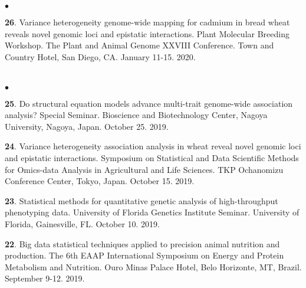 \documentclass[margin,line,10pt]{res}
\newenvironment{list2}{
  \begin{list}{$\bullet$}{%
      \setlength{\itemsep}{0in}
      \setlength{\parsep}{0in} \setlength{\parskip}{0in}
      \setlength{\topsep}{0in} \setlength{\partopsep}{0in} 
      \setlength{\leftmargin}{0.2in}}}{\end{list}}
\begin{document}
\begin{resume}
\begin{list2}
  \vspace{0.5cm}
    
\item [{\bf 26}.] Variance heterogeneity genome-wide mapping for cadmium in bread wheat reveals novel genomic loci and epistatic interactions. Plant Molecular Breeding Workshop. The Plant and Animal Genome XXVIII Conference. Town and Country Hotel, San Diego, CA. January 11-15. 2020.
  
\end{list2}



\section{}
\begin{list2}

\item [{\bf 25}.] Do structural equation models advance multi-trait genome-wide association analysis? Special Seminar. Bioscience and Biotechnology Center, Nagoya University, Nagoya, Japan. October 25. 2019.  
  
  \vspace{0.5cm}
  
   \item [{\bf 24}.] Variance heterogeneity association analysis in wheat reveal novel genomic loci and epistatic interactions. Symposium on Statistical and Data Scientific Methods for Omics-data Analysis in Agricultural and Life Sciences. TKP Ochanomizu Conference Center, Tokyo, Japan. October 15. 2019. 

     \vspace{0.5cm}
    
  \item [{\bf 23}.] Statistical methods for quantitative genetic analysis of high-throughput phenotyping data.  University of Florida Genetics Institute Seminar. University of Florida, Gainesville, FL. October 10. 2019. 

    \vspace{0.5cm}
    
\item [{\bf 22}.]  Big data statistical techniques applied to precision animal nutrition and production. The 6th EAAP International Symposium on Energy and Protein Metabolism and Nutrition. Ouro Minas Palace Hotel, Belo Horizonte, MT, Brazil. September 9-12. 2019. 

  \vspace{0.5cm}
  

\end{list2}
\end{resume}
\end{document}
